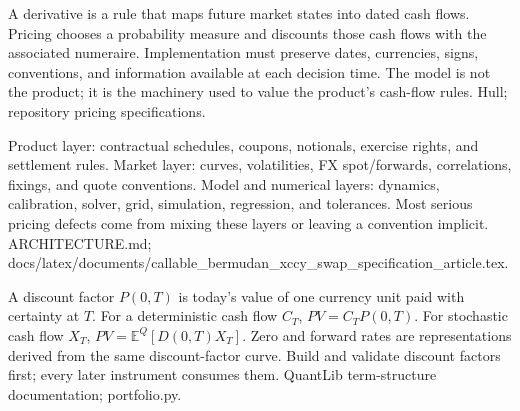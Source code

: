 \begin{frame}[plain]
\end{frame}


{A derivative is a rule that maps future market states into dated cash flows.}
{Pricing chooses a probability measure and discounts those cash flows with the associated numeraire.}
{Implementation must preserve dates, currencies, signs, conventions, and information available at each decision time.}
{The model is not the product; it is the machinery used to value the product's cash-flow rules.}
{Hull; repository pricing specifications.}

{Product layer: contractual schedules, coupons, notionals, exercise rights, and settlement rules.}
{Market layer: curves, volatilities, FX spot/forwards, correlations, fixings, and quote conventions.}
{Model and numerical layers: dynamics, calibration, solver, grid, simulation, regression, and tolerances.}
{Most serious pricing defects come from mixing these layers or leaving a convention implicit.}
{ARCHITECTURE.md; docs/latex/documents/callable\_bermudan\_xccy\_swap\_specification\_article.tex.}

{A discount factor $P(0,T)$ is today's value of one currency unit paid with certainty at $T$.}
{For a deterministic cash flow $C_T$, $PV=C_TP(0,T)$. For stochastic cash flow $X_T$, $PV=\mathbb E^Q[D(0,T)X_T]$.}
{Zero and forward rates are representations derived from the same discount-factor curve.}
{Build and validate discount factors first; every later instrument consumes them.}
{QuantLib term-structure documentation; portfolio.py.}

